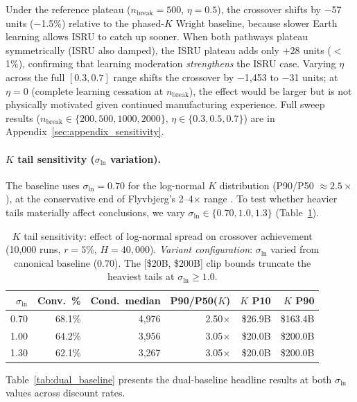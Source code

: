 \documentclass[preprint,12pt]{elsarticle}
\begin{document}
Under the reference plateau ($n_{\mathrm{break}} = 500$, $\eta = 0.5$), the crossover shifts by $-$57 units ($-$1.5\%) relative to the phased-$K$ Wright baseline, because slower Earth learning allows ISRU to catch up sooner. When both pathways plateau symmetrically (ISRU also damped), the ISRU plateau adds only $+$28 units ($<$1\%), confirming that learning moderation \emph{strengthens} the ISRU case. Varying $\eta$ across the full $[0.3, 0.7]$ range shifts the crossover by $-$1{,}453 to $-$31 units; at $\eta = 0$ (complete learning cessation at $n_{\mathrm{break}}$), the effect would be larger but is not physically motivated given continued manufacturing experience. Full sweep results ($n_{\mathrm{break}} \in \{200,500,1000,2000\}$, $\eta \in \{0.3,0.5,0.7\}$) are in Appendix~\ref{sec:appendix_sensitivity}.

\paragraph{$K$ tail sensitivity ($\sigma_{\ln}$ variation).} The baseline uses $\sigma_{\ln} = 0.70$ for the log-normal $K$ distribution (P90/P50 $\approx 2.5\times$), at the conservative end of Flyvbjerg's 2--4$\times$ range \cite{flyvbjerg2014}. To test whether heavier tails materially affect conclusions, we vary $\sigma_{\ln} \in \{0.70, 1.0, 1.3\}$ (Table~\ref{tab:sigma_ln}).

\begin{table}[htbp]
\centering
\caption{$K$ tail sensitivity: effect of log-normal spread on crossover achievement (10{,}000 runs, $r = 5\%$, $H = 40{,}000$). \emph{Variant configuration}: $\sigma_{\ln}$ varied from canonical baseline (0.70). The [\$20B, \$200B] clip bounds truncate the heaviest tails at $\sigma_{\ln} \geq 1.0$.}
\label{tab:sigma_ln}
\small
\begin{tabular}{@{}rrrrrr@{}}
\toprule
$\sigma_{\ln}$ & Conv.\ \% & Cond.\ median & P90/P50($K$) & $K$ P10 & $K$ P90 \\
\midrule
0.70 & 68.1\% & 4{,}976 & 2.50$\times$ & \$26.9B & \$163.4B \\
1.00 & 64.2\% & 3{,}956 & 3.05$\times$ & \$20.0B & \$200.0B \\
1.30 & 62.1\% & 3{,}267 & 3.05$\times$ & \$20.0B & \$200.0B \\
\bottomrule
\end{tabular}
\end{table}

Table~\ref{tab:dual_baseline} presents the dual-baseline headline results at both $\sigma_{\ln}$ values across discount rates.
\end{document}
